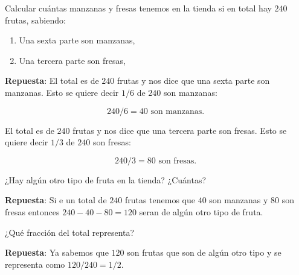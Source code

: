 \documentclass[11pt]{examdesign}
\theoremstyle{plain}
\theoremstyle{definition}
\theoremstyle{remark}
\begin{document}
    \begin{shortanswer}[title={\textit{Más problemas con fracciones...}},
    	rearrange=no,resetcounter=yes]
    	\begin{question}
    		Calcular cuántas manzanas y fresas tenemos en la tienda si en total hay $240$ frutas, sabiendo:
    		\begin{enumerate}
    			\item  Una sexta parte son manzanas,
    			
    			\item  Una tercera parte son fresas,	
    		\end{enumerate}
    		
    		\begin{answer}
    			\textbf{Repuesta}: El total es de $240$ frutas y nos dice que una sexta parte son manzanas. Esto se quiere decir $1/6$ de $240$ son manzanas:
    			
    			$$240/6=40 \mbox{ son manzanas. }$$ 
    			
    			El total es de $240$ frutas y nos dice que una tercera parte son fresas. Esto se quiere decir $1/3$ de $240$ son fresas:
    			
    			$$240/3=80 \mbox{ son fresas. }$$
    		\end{answer}
    	\end{question}
    
    	\begin{question}
    		¿Hay algún otro tipo de fruta en la tienda? ¿Cuántas?
    		
    		\begin{answer}
    			\textbf{Repuesta}: Si e un total de $240$ frutas tenemos que $40$ son manzanas y $80$ son fresas entonces $240-40-80=120$ seran de algún otro tipo de fruta.
    		\end{answer}
    	\end{question}
    
        \begin{question}
        	 ¿Qué fracción del total representa?
        	
        	\begin{answer}
        		\textbf{Repuesta}:  Ya sabemos que $120$ son frutas que son de algún otro tipo y se representa como $120/240=1/2$.
        	\end{answer}
        \end{question}
    \end{shortanswer}
\end{document}
